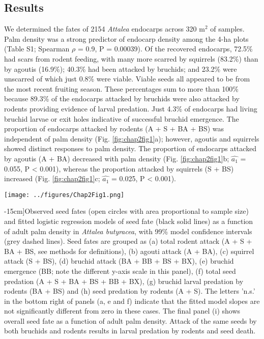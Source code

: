 \documentclass[b5paper,justified]{tufte-book} %
\begin{document}
\begin{fullwidth}
\section{Results}

We determined the fates of 2154 \textit{Attalea} endocarps across 320 m$^2$ of samples. Palm density was a strong predictor of endocarp density among the 4-ha plots (Table S1; Spearman $\rho$ = 0.9, P = 0.00039). Of the recovered endocarps, 72.5\% had scars from rodent feeding, with many more scarred by squirrels (83.2\%) than by agoutis (16.9\%); 40.3\% had been attacked by bruchids; and 23.2\% were unscarred of which just 0.8\% were viable. Viable seeds all appeared to be from the most recent fruiting season. These percentages sum to more than 100\% because 89.3\% of the endocarps attacked by bruchids were also attacked by rodents providing evidence of larval predation. Just 4.3\% of endocarps had living bruchid larvae or exit holes indicative of successful bruchid emergence. The proportion of endocarps attacked by rodents (A + S + BA + BS) was independent of palm density (Fig. \ref{fig:chap2fig1}a); however, agoutis and squirrels showed distinct responses to palm density. The proportion of endocarps attacked by agoutis (A + BA) decreased with palm density (Fig. \ref{fig:chap2fig1}b; $\hat{a_1} $  = 0.055, P < 0.001), whereas the proportion attacked by squirrels (S + BS) increased (Fig. \ref{fig:chap2fig1}c; $\hat{a_1} $  = 0.025, P < 0.001).

\begin{landscape}
 \begin{figure*}
\hspace*{4.5cm}\texttt{[image: ../figures/Chap2Fig1.png]}
\caption[Observed seed fates][-15cm]{Observed seed fates (open circles with area proportional to sample size) and fitted logistic regression models of seed fate (black solid lines) as a function of adult palm density in \textit{Attalea butyracea}, with 99\% model confidence intervals (grey dashed lines). Seed fates are grouped as (a) total rodent attack (A + S + BA + BS, see methods for definitions), (b) agouti attack (A + BA), (c) squirrel attack (S + BS), (d) bruchid attack (BA + BB + BS + BX), (e) bruchid emergence (BB; note the different y-axis scale in this panel), (f) total seed predation (A + S + BA + BS + BB + BX), (g) bruchid larval predation by rodents (BA + BS) and (h) seed predation by rodents (A + S). The letters 'n.s.' in the bottom right of panels (a, e and f) indicate that the fitted model slopes are not significantly different from zero in these cases. The final panel (i) shows overall seed fate as a function of adult palm density. Attack of the same seeds by both bruchids and rodents results in larval predation by rodents and seed death.
 }
\label{fig:chap2fig1}
\end{figure*}
\end{landscape}


\end{fullwidth}
\end{document}
